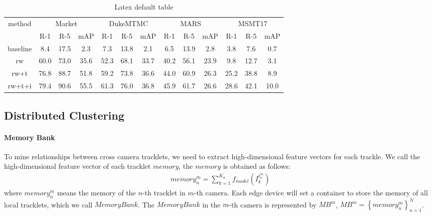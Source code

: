 \documentclass{article}
\begin{document}
\renewcommand\arraystretch{1.5}
\begin{table}
\centering
\begin{tabular}{c|c c c|c c c|c c c|c c c}
\hline
\multirow{2}{*}{method} & 
\multicolumn{3}{c|}{Market} & \multicolumn{3}{c|}{DukeMTMC} & \multicolumn{3}{c|}{MARS} & \multicolumn{3}{c}{MSMT17} \\
\cline{2-13} 
& R-1 & R-5 & mAP & R-1 & R-5 & mAP & R-1 & R-5 & mAP & R-1 & R-5 & mAP\\ \hline
\hline
baseline & 8.4   & 17.5  &  2.3 &  7.3 & 13.8  &  2.1  &  6.5  & 13.9  &  2.8  & 3.8   & 7.6    &  0.7  \\
rw       & 60.0  & 73.0  & 35.6 & 52.3 & 68.1  & 33.7  & 40.2  & 56.1  & 23.9  & 9.8   & 12.7   &  3.1  \\
rw+t     & 76.8  & 88.7  & 51.8 & 59.2 & 73.8  & 36.6  & 44.0  & 60.9  & 26.3  & 25.2  & 38.8   &  8.9  \\
rw+t+i   & 79.4  & 90.6  & 55.5 & 61.3 & 76.0  & 36.8  & 45.9  & 61.7  & 26.6  & 28.6  & 42.1   &  10.0  \\
\hline
\end{tabular}
\caption{Latex default table}
\label{tab:plain}
\end{table}




\subsection{Distributed Clustering}
\paragraph{Memory Bank}To mine relationships between cross camera tracklets, we need to extract high-dimensional feature vectors for each trackle. We call the high-dimensional feature vector of each tracklet $memory$, the $memory$ is obtained as follows:
\begin{equation}
\begin{aligned}
memory_{n}^{m} = \sum_{k=1}^{K_{n}}f_{model}(I_{k}^{t_{n}^{m}})
\end{aligned}
\end{equation}
where $memory_{n}^{m}$ means the memory of the $n$-th tracklet in $m$-th camera. Each edge device will set a container to store the memory of all local tracklets, which we call $Memory Bank$. The $Memory Bank$ in the $m$-th camera is represented by $MB^{m}$, $MB^{m} = \left \{ memory_{n}^{m} \right \}_{n=1}^{N}$.
\end{document}
